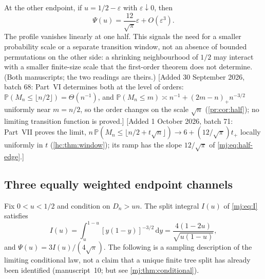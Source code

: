 \documentclass[11pt,a4paper]{article}
\theoremstyle{definition}\newaliascnt{definition}{theorem}
\theoremstyle{remark}\newaliascnt{remark}{theorem}
\newcommand{\dd}{\mathrm d}
\newcommand{\ljP}{\mathbb P}
\begin{document}
At the other endpoint, if $u=1/2-\varepsilon$ with $\varepsilon\downarrow0$,
then
\begin{equation}
 \Psi(u)=\frac{12}{\sqrt\pi}\varepsilon+O(\varepsilon^3).
 \label{mj:eq:half-edge}
\end{equation}
The profile vanishes linearly at one half. This signals the need for a
smaller probability scale or a separate transition window, not an absence of
bounded permutations on the other side: a shrinking neighbourhood of $1/2$ may
interact with a smaller finite-size scale that the first-order theorem does
not determine. (Both manuscripts; the two readings are theirs.)
[Added 30 September 2026, batch 68: Part~VI determines both at the level of
orders: $\ljP(M_n\le\lfloor n/2\rfloor)=\Theta(n^{-1})$, and
$\ljP(M_n\le m)\asymp n^{-1}+(2m-n)_+n^{-3/2}$ uniformly near $m=n/2$, so
the order changes on the scale $\sqrt n$ (\cref{pr:cor:half}); no limiting
transition function is proved.]
[Added 1 October 2026, batch 71: Part~VII proves the limit,
$n\,\ljP(M_n\le\lfloor n/2+t\sqrt n\rfloor)\to6+(12/\sqrt\pi)t_+$ locally
uniformly in $t$ (\cref{hc:thm:window}); its ramp has the slope
$12/\sqrt\pi$ of \eqref{mj:eq:half-edge}.]

\subsection{Three equally weighted endpoint channels}
Fix $0<u<1/2$ and condition on $D_n>un$. The split integral $I(u)$ of
\eqref{mj:eq:I} satisfies
\begin{equation}
 I(u)=\int_u^{1-u}[y(1-y)]^{-3/2}\,\dd y
 =\frac{4(1-2u)}{\sqrt{u(1-u)}},
 \label{mj:eq:Iu}
\end{equation}
and $\Psi(u)=3I(u)/(4\sqrt\pi)$. The following is a sampling description of
the limiting conditional law, not a claim that a unique finite tree split has
already been identified (manuscript~10; but see \cref{mj:thm:conditional}).
\end{document}
